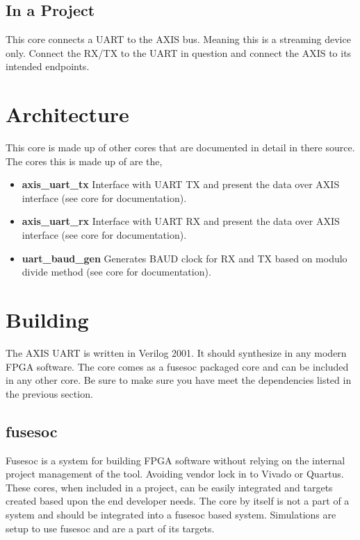 

\subsection{In a Project}
\par
This core connects a UART to the AXIS bus. Meaning this is a streaming device only. Connect the RX/TX to the UART in question and connect the AXIS to its intended endpoints.

\section{Architecture}
\par
This core is made up of other cores that are documented in detail in there source. The cores this is made up of are the,
\begin{itemize}
  \item \textbf{axis\_uart\_tx} Interface with UART TX and present the data over AXIS interface (see core for documentation).
  \item \textbf{axis\_uart\_rx} Interface with UART RX and present the data over AXIS interface (see core for documentation).
  \item \textbf{uart\_baud\_gen} Generates BAUD clock for RX and TX based on modulo divide method (see core for documentation).
\end{itemize}

\section{Building}

\par
The AXIS UART is written in Verilog 2001. It should synthesize in any modern FPGA software. The core comes as a fusesoc packaged core and can be
included in any other core. Be sure to make sure you have meet the dependencies listed in the previous section.

\subsection{fusesoc}
\par
Fusesoc is a system for building FPGA software without relying on the internal project management of the tool. Avoiding vendor lock in to Vivado or Quartus.
These cores, when included in a project, can be easily integrated and targets created based upon the end developer needs. The core by itself is not a part of
a system and should be integrated into a fusesoc based system. Simulations are setup to use fusesoc and are a part of its targets.

